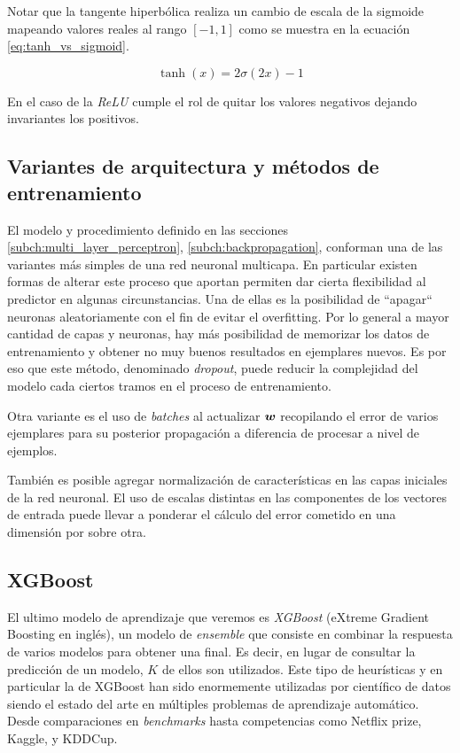 Notar que la tangente hiperbólica realiza un cambio de escala de la sigmoide
mapeando valores reales al rango $[-1, 1]$ como se muestra en la ecuación
\ref{eq:tanh_vs_sigmoid}.

\begin{equation} \label{eq:tanh_vs_sigmoid}
    \tanh\left( x \right) = 2 \sigma(2x) - 1
\end{equation}

En el caso de la \emph{ReLU} cumple el rol de quitar los valores negativos
dejando invariantes los positivos.

\subsection{Variantes de arquitectura y métodos de entrenamiento}

El modelo y procedimiento definido en las secciones
\ref{subch:multi_layer_perceptron}, \ref{subch:backpropagation}, conforman una
de las variantes más simples de una red neuronal multicapa. En particular
existen formas de alterar este proceso que aportan permiten dar cierta
flexibilidad al predictor en algunas circunstancias. Una de ellas es la
posibilidad de ``apagar`` neuronas aleatoriamente con el fin de evitar el
overfitting. Por lo general a mayor cantidad de capas y neuronas, hay más
posibilidad de memorizar los datos de entrenamiento y obtener no muy buenos
resultados en ejemplares nuevos. Es por eso que este método, denominado
\emph{dropout}, puede reducir la complejidad del modelo cada ciertos tramos en
el proceso de entrenamiento.

Otra variante es el uso de \emph{batches} al actualizar $\boldsymbol{w}$ recopilando
el error de varios ejemplares para su posterior propagación a diferencia de
procesar a nivel de ejemplos.

También es posible agregar normalización de características en las capas
iniciales de la red neuronal. El uso de escalas distintas en las componentes de
los vectores de entrada puede llevar a ponderar el cálculo del error cometido en
una dimensión por sobre otra.

\subsection{XGBoost}
\label{alg:xgboost}

El ultimo modelo de aprendizaje que veremos es \emph{XGBoost} (eXtreme Gradient
Boosting en inglés), un modelo de \emph{ensemble} que consiste en combinar la
respuesta de varios modelos para obtener una final. Es decir, en lugar de
consultar la predicción de un modelo, $K$ de ellos son utilizados. Este tipo de
heurísticas y en particular la de XGBoost han sido enormemente utilizadas por
científico de datos siendo el estado del arte en múltiples problemas de
aprendizaje automático. Desde comparaciones en \emph{benchmarks} hasta
competencias como Netflix prize, Kaggle, y KDDCup.

